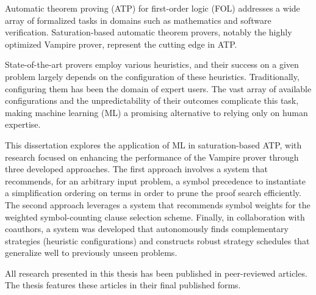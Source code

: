 Automatic theorem proving (ATP) for first-order logic (FOL) addresses a wide array of formalized tasks in domains such as mathematics and software verification. Saturation-based automatic theorem provers, notably the highly optimized Vampire prover, represent the cutting edge in ATP.

State-of-the-art provers employ various heuristics, and their success on a given problem largely depends on the configuration of these heuristics. Traditionally, configuring them has been the domain of expert users. The vast array of available configurations and the unpredictability of their outcomes complicate this task, making machine learning (ML) a promising alternative to relying only on human expertise.

This dissertation explores the application of ML in saturation-based ATP, with research focused on enhancing the performance of the Vampire prover through three developed approaches. The first approach involves a system that recommends, for an arbitrary input problem, a symbol precedence to instantiate a simplification ordering on terms in order to prune the proof search efficiently. The second approach leverages a system that recommends symbol weights for the weighted symbol-counting clause selection scheme. Finally, in collaboration with coauthors, a system was developed that autonomously finds complementary strategies (heuristic configurations) and constructs robust strategy schedules that generalize well to previously unseen problems.

All research presented in this thesis has been published in peer-reviewed articles. The thesis features these articles in their final published forms.

